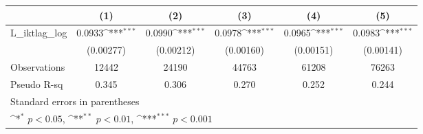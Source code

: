 {
\def\sym#1{\ifmmode^{#1}\else\(^{#1}\)\fi}
\begin{tabular}{l*{5}{c}}
\hline\hline
                &\multicolumn{1}{c}{(1)}         &\multicolumn{1}{c}{(2)}         &\multicolumn{1}{c}{(3)}         &\multicolumn{1}{c}{(4)}         &\multicolumn{1}{c}{(5)}         \\
\hline
L\_iktlag\_log    &   0.0933\sym{***}&   0.0990\sym{***}&   0.0978\sym{***}&   0.0965\sym{***}&   0.0983\sym{***}\\
                &(0.00277)         &(0.00212)         &(0.00160)         &(0.00151)         &(0.00141)         \\
\hline
Observations    &    12442         &    24190         &    44763         &    61208         &    76263         \\
Pseudo R-sq     &    0.345         &    0.306         &    0.270         &    0.252         &    0.244         \\
\hline\hline
\multicolumn{6}{l}{\footnotesize Standard errors in parentheses}\\
\multicolumn{6}{l}{\footnotesize \sym{*} \(p<0.05\), \sym{**} \(p<0.01\), \sym{***} \(p<0.001\)}\\
\end{tabular}
}
